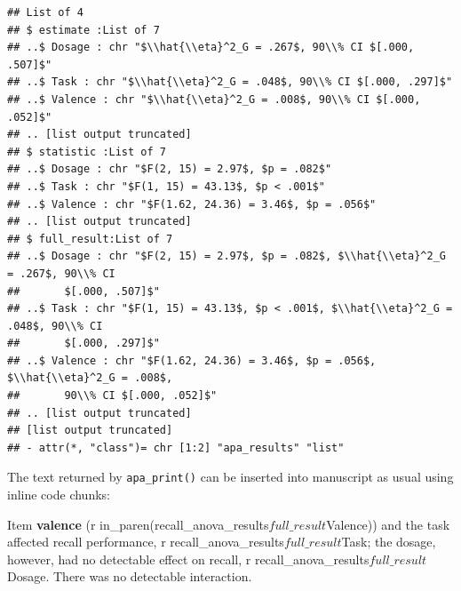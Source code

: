 \documentclass[
  english,
  ,man,floatsintext]{apa6}
\newenvironment{Shaded}{\begin{snugshade}}{\end{snugshade}}
\newcommand{\AttributeTok}[1]{\textcolor[rgb]{0.13,0.29,0.53}{#1}}
\newcommand{\FunctionTok}[1]{\textcolor[rgb]{0.13,0.29,0.53}{\textbf{#1}}}
\newcommand{\NormalTok}[1]{#1}
\newcommand{\StringTok}[1]{\textcolor[rgb]{0.31,0.60,0.02}{#1}}
\begin{document}
\begin{footnotesize}

\begin{verbatim}
## List of 4
## $ estimate :List of 7
## ..$ Dosage : chr "$\\hat{\\eta}^2_G = .267$, 90\\% CI $[.000, .507]$"
## ..$ Task : chr "$\\hat{\\eta}^2_G = .048$, 90\\% CI $[.000, .297]$"
## ..$ Valence : chr "$\\hat{\\eta}^2_G = .008$, 90\\% CI $[.000, .052]$"
## .. [list output truncated]
## $ statistic :List of 7
## ..$ Dosage : chr "$F(2, 15) = 2.97$, $p = .082$"
## ..$ Task : chr "$F(1, 15) = 43.13$, $p < .001$"
## ..$ Valence : chr "$F(1.62, 24.36) = 3.46$, $p = .056$"
## .. [list output truncated]
## $ full_result:List of 7
## ..$ Dosage : chr "$F(2, 15) = 2.97$, $p = .082$, $\\hat{\\eta}^2_G = .267$, 90\\% CI
##       $[.000, .507]$"
## ..$ Task : chr "$F(1, 15) = 43.13$, $p < .001$, $\\hat{\\eta}^2_G = .048$, 90\\% CI
##       $[.000, .297]$"
## ..$ Valence : chr "$F(1.62, 24.36) = 3.46$, $p = .056$, $\\hat{\\eta}^2_G = .008$,
##       90\\% CI $[.000, .052]$"
## .. [list output truncated]
## [list output truncated]
## - attr(*, "class")= chr [1:2] "apa_results" "list"
\end{verbatim}

\end{footnotesize}

The text returned by \texttt{apa\_print()} can be inserted into manuscript as usual using inline code chunks:

\begin{Shaded}
\begin{Highlighting}[]
\NormalTok{Item }\FunctionTok{valence}\NormalTok{ (}\StringTok{\textasciigrave{}}\AttributeTok{r in\_paren(recall\_anova\_results$full\_result$Valence)}\StringTok{\textasciigrave{}}\NormalTok{) and}
\NormalTok{the task affected recall performance,}
\StringTok{\textasciigrave{}}\AttributeTok{r recall\_anova\_results$full\_result$Task}\StringTok{\textasciigrave{}}\NormalTok{; the dosage, however, had no}
\NormalTok{detectable effect on recall, }\StringTok{\textasciigrave{}}\AttributeTok{r recall\_anova\_results$full\_result$Dosage}\StringTok{\textasciigrave{}}\NormalTok{.}
\NormalTok{There was no detectable interaction.}
\end{Highlighting}
\end{Shaded}
\end{document}
